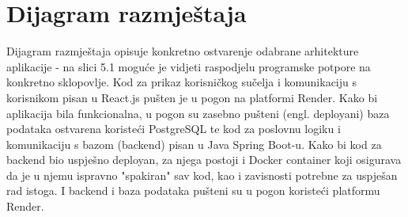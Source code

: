 			
			
			
			 
			
		
		
		\section{Dijagram razmještaja}
			

                Dijagram razmještaja opisuje konkretno ostvarenje odabrane arhitekture aplikacije - na slici 5.1 moguće je vidjeti raspodjelu programske potpore na konkretno sklopovlje. Kod za prikaz korisničkog sučelja i komunikaciju s korisnikom pisan u React.js pušten je u pogon na platformi Render. Kako bi aplikacija bila funkcionalna, u pogon su zasebno pušteni (engl. deployani) baza podataka ostvarena koristeći PostgreSQL te kod za poslovnu logiku i komunikaciju s bazom (backend) pisan u Java Spring Boot-u. Kako bi kod za backend bio uspješno deployan, za njega postoji i Docker container koji osigurava da je u njemu ispravno "spakiran" sav kod, kao i zavisnosti potrebne za uspješan rad istoga. I backend i baza podataka pušteni su u pogon koristeći platformu Render. \\

